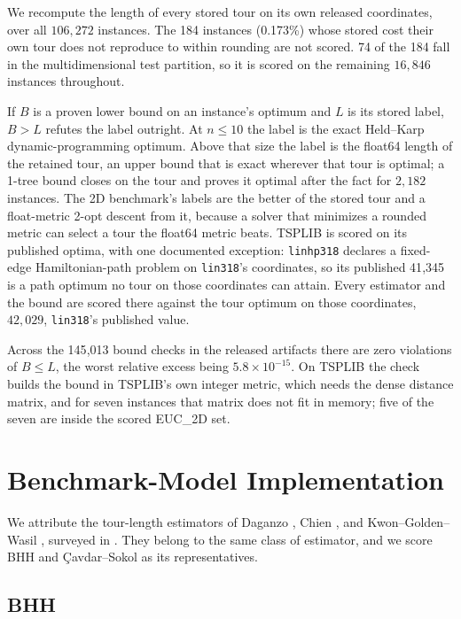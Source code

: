 \documentclass{article}
\begin{document}
We recompute the length of every stored tour on its own released coordinates, over all $106{,}272$ instances. The 184 instances (0.173\%) whose stored cost their own tour does not reproduce to within rounding are not scored. 74 of the 184 fall in the multidimensional test partition, so it is scored on the remaining $16{,}846$ instances throughout.

If $B$ is a proven lower bound on an instance's optimum and $L$ is its stored label, $B>L$ refutes the label outright. At $n\le10$ the label is the exact Held--Karp dynamic-programming optimum. Above that size the label is the float64 length of the retained tour, an upper bound that is exact wherever that tour is optimal; a 1-tree bound closes on the tour and proves it optimal after the fact for $2{,}182$ instances. The 2D benchmark's labels are the better of the stored tour and a float-metric 2-opt descent from it, because a solver that minimizes a rounded metric can select a tour the float64 metric beats. TSPLIB is scored on its published optima, with one documented exception: \texttt{linhp318} declares a fixed-edge Hamiltonian-path problem on \texttt{lin318}'s coordinates, so its published 41{,}345 is a path optimum no tour on those coordinates can attain. Every estimator and the bound are scored there against the tour optimum on those coordinates, $42{,}029$, \texttt{lin318}'s published value.

Across the 145{,}013 bound checks in the released artifacts there are zero violations of $B\le L$, the worst relative excess being $5.8\times10^{-15}$. On TSPLIB the check builds the bound in TSPLIB's own integer metric, which needs the dense distance matrix, and for seven instances that matrix does not fit in memory; five of the seven are inside the scored EUC\_2D set.

\section{Benchmark-Model Implementation} \label{app:bench_details}

We attribute the tour-length estimators of Daganzo \citep{daganzo1984a}, Chien \citep{chien1992operational}, and Kwon--Golden--Wasil \citep{kwon1995tsp}, surveyed in \citet{figliozzi2009planning}. They belong to the same class of estimator, and we score BHH and \c{C}avdar--Sokol as its representatives.

\subsection{BHH}
\end{document}
